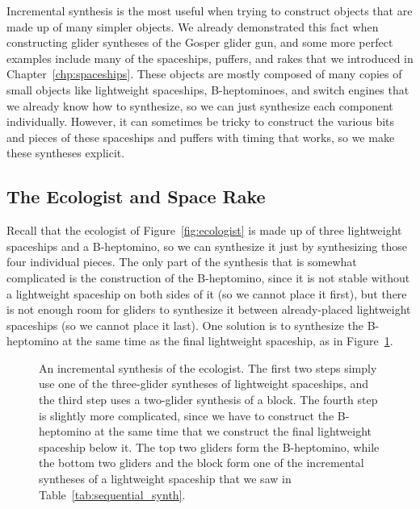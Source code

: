 Incremental synthesis is the most useful when trying to construct objects that are made up of many simpler objects. We already demonstrated this fact when constructing glider syntheses of the Gosper glider gun, and some more perfect examples include many of the spaceships, puffers, and rakes that we introduced in Chapter~\ref{chp:spaceships}. These objects are mostly composed of many copies of small objects like lightweight spaceships, B-heptominoes, and switch engines that we already know how to synthesize, so we can just synthesize each component individually. However, it can sometimes be tricky to construct the various bits and pieces of these spaceships and puffers with timing that works, so we make these syntheses explicit. 


\subsection{The Ecologist and Space Rake}\label{sec:sequential_space_rake}

Recall that the ecologist of Figure~\ref{fig:ecologist} is made up of three lightweight spaceships and a B-heptomino, so we can synthesize it just by synthesizing those four individual pieces. The only part of the synthesis that is somewhat complicated is the construction of the B-heptomino, since it is not stable without a lightweight spaceship on both sides of it (so we cannot place it first), but there is not enough room for gliders to synthesize it between already-placed lightweight spaceships (so we cannot place it last). One solution is to synthesize the B-heptomino at the same time as the final lightweight spaceship, as in Figure~\ref{fig:ecologist_synth}.
\begin{figure}[!ht]
	\centering
	
	\caption{An incremental synthesis of the ecologist. The first two steps simply use one of the three-glider syntheses of lightweight spaceships, and the third step uses a two-glider synthesis of a block. The fourth step is slightly more complicated, since we have to construct the B-heptomino at the same time that we construct the final lightweight spaceship below it. The top two gliders form the B-heptomino, while the bottom two gliders and the block form one of the incremental syntheses of a lightweight spaceship that we saw in Table~\ref{tab:sequential_synth}.}\label{fig:ecologist_synth}
\end{figure}

